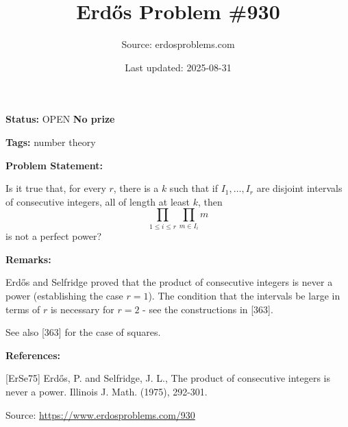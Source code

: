 \documentclass{article}
\title{Erd\H{o}s Problem \#930}
\date{Last updated: 2025-08-31}
\author{Source: erdosproblems.com}
\begin{document}
\maketitle

\noindent\textbf{Status:} OPEN \quad \textbf{No prize}

\noindent\textbf{Tags:} number theory

\medskip
\noindent\textbf{Problem Statement:}

Is it true that, for every $r$, there is a $k$ such that if $I_1,\ldots,I_r$ are disjoint intervals of consecutive integers, all of length at least $k$, then\[\prod_{1\leq i\leq r}\prod_{m\in I_i}m\]is not a perfect power?

\bigskip
\noindent\textbf{Remarks:}

Erd\H{o}s and Selfridge \cite{ErSe75} proved that the product of consecutive integers is never a power (establishing the case $r=1$). The condition that the intervals be large in terms of $r$ is necessary for $r=2$ - see the constructions in [363].

See also [363] for the case of squares.

\bigskip
\noindent\textbf{References:}

[ErSe75] Erd\H{o}s, P. and Selfridge, J. L., The product of consecutive integers is never a power. Illinois J. Math. (1975), 292-301.

\bigskip
\noindent\small{Source: \url{https://www.erdosproblems.com/930}}
\end{document}
